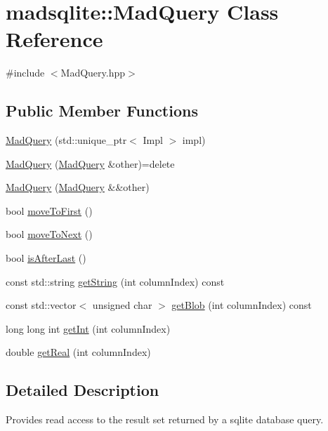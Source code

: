 \hypertarget{classmadsqlite_1_1_mad_query}{}\section{madsqlite\+:\+:Mad\+Query Class Reference}
\label{classmadsqlite_1_1_mad_query}


{\ttfamily \#include $<$Mad\+Query.\+hpp$>$}

\subsection*{Public Member Functions}
\begin{DoxyCompactItemize}
\item 
\hyperlink{classmadsqlite_1_1_mad_query_a4e7a3212c6dd8c86e5579e43627b9013}{Mad\+Query} (std\+::unique\+\_\+ptr$<$ Impl $>$ impl)
\item 
\hyperlink{classmadsqlite_1_1_mad_query_a52f4a1417de26c9e2edb46bae17892ef}{Mad\+Query} (\hyperlink{classmadsqlite_1_1_mad_query}{Mad\+Query} \&other)=delete
\item 
\hyperlink{classmadsqlite_1_1_mad_query_a0a4ebbd16bfc54d95fc7a87517d4f21e}{Mad\+Query} (\hyperlink{classmadsqlite_1_1_mad_query}{Mad\+Query} \&\&other)
\item 
bool \hyperlink{classmadsqlite_1_1_mad_query_a37a601031ecedf20e53b8c0f610f74b0}{move\+To\+First} ()
\item 
bool \hyperlink{classmadsqlite_1_1_mad_query_a2eecba50378a4577803aff41671829fe}{move\+To\+Next} ()
\item 
bool \hyperlink{classmadsqlite_1_1_mad_query_a0fa757aa8333e3fc53c57442bdf4cad7}{is\+After\+Last} ()
\item 
const std\+::string \hyperlink{classmadsqlite_1_1_mad_query_a63b55fe68d013c3d1fdade2391233cb9}{get\+String} (int column\+Index) const
\item 
const std\+::vector$<$ unsigned char $>$ \hyperlink{classmadsqlite_1_1_mad_query_a4f39ec059990e88d11b3d11244283000}{get\+Blob} (int column\+Index) const
\item 
long long int \hyperlink{classmadsqlite_1_1_mad_query_ab04d59c89fccfd773f77276219f4d376}{get\+Int} (int column\+Index)
\item 
double \hyperlink{classmadsqlite_1_1_mad_query_ab1d5375285453976e078f320c73e224f}{get\+Real} (int column\+Index)
\end{DoxyCompactItemize}


\subsection{Detailed Description}
Provides read access to the result set returned by a sqlite database query. 

